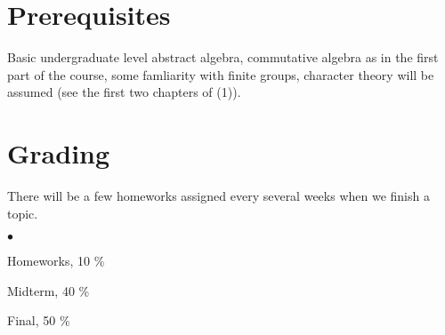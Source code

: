 \documentclass[margin,line]{res}
\newenvironment{list2}{
  \begin{list}{$\bullet$}{%
      \setlength{\itemsep}{0in}
      \setlength{\parsep}{0in} \setlength{\parskip}{0in}
      \setlength{\topsep}{0in} \setlength{\partopsep}{0in}
      \setlength{\leftmargin}{0.2in}}}{\end{list}}
\begin{document}
\begin{resume}
\section{\sc Prerequisites}
Basic undergraduate level abstract algebra, commutative algebra as in the first part of the course, some famliarity with finite groups, character theory will be assumed (see the first two chapters of (1)).


\section{\sc Grading}
There will be a few homeworks assigned every several weeks when we finish a topic.
\begin{list2}
\item Homeworks, 10 \%
\item Midterm, 40 \%
\item Final, 50 \%
\end{list2}

\end{resume}
\end{document}
